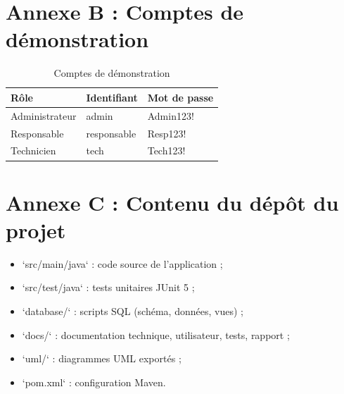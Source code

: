 \documentclass[11pt,a4paper]{report}
\begin{document}
\section*{Annexe B : Comptes de démonstration}
\begin{table}[htbp]\centering\small
\begin{tabularx}{\textwidth}{|X|X|X|}
\hline\rowcolor{hdr}\textbf{Rôle} & \textbf{Identifiant} & \textbf{Mot de passe}\\ \hline
Administrateur & admin & Admin123!\\ \hline
Responsable & responsable & Resp123!\\ \hline
Technicien & tech & Tech123!\\ \hline
\end{tabularx}
\caption{Comptes de démonstration}
\end{table}
\section*{Annexe C : Contenu du dépôt du projet}
\begin{itemize}
  \item `src/main/java` : code source de l'application ;
  \item `src/test/java` : tests unitaires JUnit 5 ;
  \item `database/` : scripts SQL (schéma, données, vues) ;
  \item `docs/` : documentation technique, utilisateur, tests, rapport ;
  \item `uml/` : diagrammes UML exportés ;
  \item `pom.xml` : configuration Maven.
\end{itemize}
\end{document}
